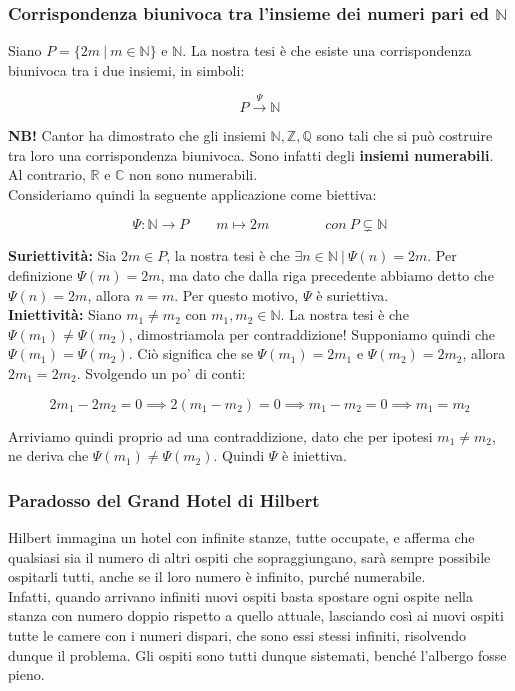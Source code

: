 \documentclass{article}
\begin{document}
\subsubsection{Corrispondenza biunivoca tra l'insieme dei numeri pari ed $\mathbb{N}$}
Siano $P = \{2m \ | \ m \in \mathbb{N}\}$ e $\mathbb{N}$. La nostra tesi è che esiste una corrispondenza biunivoca tra i due insiemi, in simboli:

\begin{equation*}
    P \overset{\Psi}{\longrightarrow} \mathbb{N}
\end{equation*}

\noindent\textbf{NB!} Cantor ha dimostrato che gli insiemi $\mathbb{N}, \mathbb{Z}, \mathbb{Q}$ sono tali che si può costruire tra loro una corrispondenza biunivoca. Sono infatti degli \textbf{insiemi numerabili}. Al contrario, $\mathbb{R}$ e $\mathbb{C}$ non sono numerabili.\\

\noindent Consideriamo quindi la seguente applicazione come biettiva: 

\begin{equation*}
    \Psi: \mathbb{N} \xrightarrow{} P \qquad m \longmapsto 2m \qquad \qquad con \ P \subsetneq \mathbb{N}
\end{equation*}

\noindent\textbf{Suriettività:} Sia $2m \in P$, la nostra tesi è che $\exists n \in \mathbb{N} \ | \ \Psi(n) = 2m$. Per definizione $\Psi(m) = 2m$, ma dato che dalla riga precedente abbiamo detto che $\Psi(n) = 2m$, allora $n = m$. Per questo motivo, $\Psi$ è suriettiva.\\

\noindent\textbf{Iniettività:} Siano $m_1 \neq m_2$ con $m_1, m_2 \in \mathbb{N}$. La nostra tesi è che $\Psi(m_1) \neq \Psi(m_2)$, dimostriamola per contraddizione! Supponiamo quindi che $\Psi(m_1) = \Psi(m_2)$. Ciò significa che se $\Psi(m_1) = 2m_1$ e $\Psi(m_2) = 2m_2$, allora $2m_1 = 2m_2$. Svolgendo un po' di conti:

\begin{equation*}
    2m_1 - 2m_2 = 0 \implies 2(m_1-m_2) = 0 \implies m_1 - m_2 = 0 \implies m_1 = m_2
\end{equation*}

\noindent Arriviamo quindi proprio ad una contraddizione, dato che per ipotesi $m_1 \neq m_2$, ne deriva che $\Psi(m_1) \neq \Psi(m_2)$. Quindi $\Psi$ è iniettiva.

\subsubsection{Paradosso del Grand Hotel di Hilbert}
Hilbert immagina un hotel con infinite stanze, tutte occupate, e afferma che qualsiasi sia il numero di altri ospiti che sopraggiungano, sarà sempre possibile ospitarli tutti, anche se il loro numero è infinito, purché numerabile.\\
Infatti, quando arrivano infiniti nuovi ospiti basta spostare ogni ospite nella stanza con numero doppio rispetto a quello attuale, lasciando così ai nuovi ospiti tutte le camere con i numeri dispari, che sono essi stessi infiniti, risolvendo dunque il problema. Gli ospiti sono tutti dunque sistemati, benché l'albergo fosse pieno.
\end{document}
